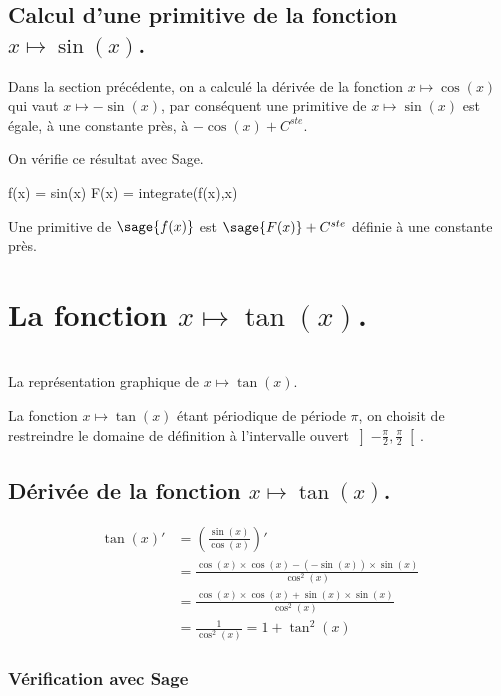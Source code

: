 \documentclass[a4paper,12pt]{report}
\begin{document}
\subsection{Calcul d'une primitive de la fonction  $x \mapsto \sin(x)$.}

Dans la section précédente, on a calculé la dérivée de la fonction $x \mapsto \cos(x)$ qui vaut $x \mapsto -\sin(x)$, par conséquent une primitive de $x \mapsto \sin(x)$ est égale, à une constante près, à $ - \cos(x) + C^{ste} $.

On vérifie ce résultat avec Sage.

\begin{sageblock}
    f(x) = sin(x)
    F(x) = integrate(f(x),x) 
\end{sageblock}

Une primitive de $\sage{f(x)}$ est $ \sage{F(x)} + C^{ste} $ définie à une constante près.


\section{La fonction  $x \mapsto \tan(x)$.}

\begin{center}
 \\
La représentation graphique de $x\mapsto \tan(x)$.
\end{center}


La fonction $x \mapsto \tan(x)$ étant périodique de période $\pi$, on choisit de restreindre le domaine de définition à l'intervalle ouvert $ \left] -\frac{\pi}{ 2} , \frac{\pi}{ 2} \right[ $.


\subsection{Dérivée de la fonction $x \mapsto \tan(x)$.}

\begin{align*}
\tan(x)' 
& =  \left(\frac{\sin(x)}{\cos(x)}\right)' \\ 
& =  \frac{\cos(x) \times \cos(x) - (-\sin(x)) \times \sin(x)}{\cos^2(x)}  \\ 
& =  \frac{\cos(x) \times \cos(x) + \sin(x)\times \sin(x)}{\cos^2(x)}  \\ 
& =  \frac{1}{\cos^2(x)} = 1 + \tan^2(x)
\end{align*}

\subsubsection{Vérification avec Sage}
\end{document}
